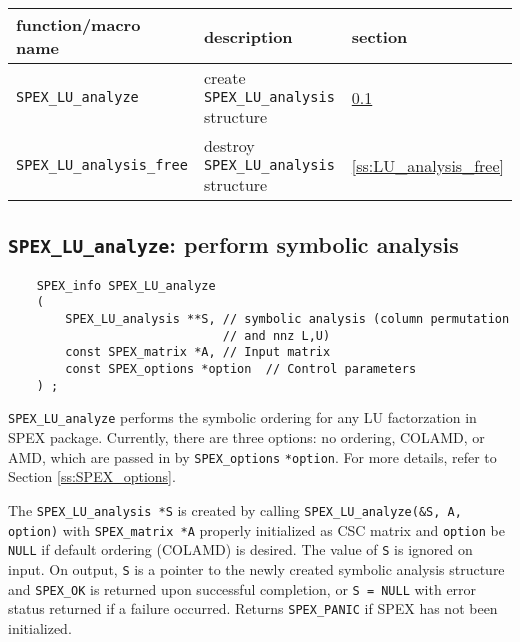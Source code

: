 \documentclass[12pt]{report}
\theoremstyle{definition}
\begin{document}
{\small
\begin{center}
\begin{tabular}{lll}
\hline
function/macro name & description & section \\
\hline
\verb|SPEX_LU_analyze|
    & create \verb|SPEX_LU_analysis| structure
    & \ref{s:SPEX_LU_analyze} \\
\hline
\verb|SPEX_LU_analysis_free|
    & destroy \verb|SPEX_LU_analysis| structure
    & \ref{ss:LU_analysis_free} \\
\hline
\end{tabular}
\end{center}
}

\cprotect\subsection{\verb|SPEX_LU_analyze|: perform symbolic analysis}
\label{s:SPEX_LU_analyze}

\begin{mdframed}[userdefinedwidth=6in]
{\footnotesize
\begin{verbatim}
    SPEX_info SPEX_LU_analyze
    (
        SPEX_LU_analysis **S, // symbolic analysis (column permutation
                              // and nnz L,U)
        const SPEX_matrix *A, // Input matrix
        const SPEX_options *option  // Control parameters
    ) ;
\end{verbatim}
} \end{mdframed}

\verb|SPEX_LU_analyze| performs the symbolic ordering for any LU factorzation in SPEX package. Currently,
there are three options: no ordering, COLAMD, or AMD, which are passed in by
\verb|SPEX_options| \verb|*option|. For more details, refer to
Section \ref{ss:SPEX_options}.

The \verb|SPEX_LU_analysis *S| is created by calling
\verb|SPEX_LU_analyze(&S, A, option)| with \verb|SPEX_matrix *A| properly
initialized as CSC matrix and \verb|option| be \verb|NULL| if default ordering
(COLAMD) is desired. The value of \verb|S| is ignored on input.  On output,
\verb|S| is a pointer to the newly created symbolic analysis structure and
\verb|SPEX_OK| is returned upon successful completion, or \verb|S = NULL| with
error status returned if a failure occurred.  Returns \verb|SPEX_PANIC| if SPEX
has not been initialized.
\end{document}
